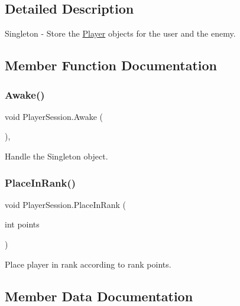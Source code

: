 \subsection{Detailed Description}
Singleton -\/ Store the \mbox{\hyperlink{class_player}{Player}} objects for the user and the enemy. 

\subsection{Member Function Documentation}
\mbox{\label{class_player_session_a5f382c3a86c0042bfad86f54299bb119}} 
\subsubsection{\texorpdfstring{Awake()}{Awake()}}
{\footnotesize\ttfamily void Player\+Session.\+Awake (\begin{DoxyParamCaption}{ }\end{DoxyParamCaption})\hspace{0.3cm}{\ttfamily [inline]}, {\ttfamily [private]}}



Handle the Singleton object. 

\mbox{\label{class_player_session_aeb4aa3bf4eaaa1f444ab5d9e06144898}} 
\subsubsection{\texorpdfstring{PlaceInRank()}{PlaceInRank()}}
{\footnotesize\ttfamily void Player\+Session.\+Place\+In\+Rank (\begin{DoxyParamCaption}\item[{int}]{points }\end{DoxyParamCaption})\hspace{0.3cm}{\ttfamily [inline]}}



Place player in rank according to rank points. 



\subsection{Member Data Documentation}
\mbox{\label{class_player_session_abef83de04d9672e0af2c9313ecde1dc1}} 
